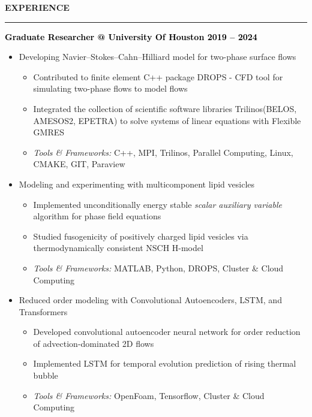 \documentclass[10pt,letterpaper]{letter}
\newcommand{\gsect}[1]{\textcolor{codepurple}{\textbf{{\Large \uppercase{#1} }}} \\ \hrule}
\newcommand{\gsubsect}[1]{\textcolor{black}{\textbf{{\large #1 }}} }
\begin{document}
\gsect{Experience}

\gsubsect{Graduate Researcher @ University Of Houston \hfill 2019 -- 2024}

\begin{itemize}
	\item {\color{red!50!black}Developing Navier–Stokes–Cahn–Hilliard model for two-phase surface flows}
	\begin{itemize}
	\item {Contributed to finite element C++ package DROPS - CFD tool for simulating two-phase flows  to model flows}
	\item {Integrated the collection of scientific software libraries Trilinos(BELOS, AMESOS2, EPETRA) to solve systems of linear equations with Flexible GMRES}
			\item { \textsl{Tools \& Frameworks:} C++, MPI, Trilinos, Parallel Computing, Linux, CMAKE, GIT, Paraview}
	\end{itemize}
\end{itemize}
\begin{itemize}
	\item {\color{red!50!black}Modeling and experimenting with multicomponent lipid vesicles}
	\begin{itemize}
		\item {Implemented unconditionally energy stable \textsl{scalar auxiliary variable} algorithm for phase field equations }
		\item {Studied fusogenicity of positively charged lipid vesicles via thermodynamically consistent NSCH H-model}
		\item {\textsl{Tools \& Frameworks:} MATLAB, Python, DROPS, Cluster \& Cloud Computing}
	\end{itemize}
\end{itemize}
\begin{itemize}
	\item { \color{red!50!black}Reduced order modeling with Convolutional Autoencoders, LSTM, and Transformers}
	\begin{itemize}
		\item {Developed convolutional autoencoder neural network for order reduction of advection-dominated 2D flows}
		\item {Implemented LSTM for temporal evolution prediction of rising thermal bubble }
		\item {\textsl{Tools \& Frameworks:} OpenFoam, Tensorflow, Cluster \& Cloud Computing}
	\end{itemize}
\end{itemize}
\end{document}
